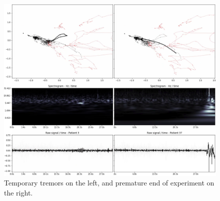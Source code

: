 \begin{figure}[ht]
\centering
\includegraphics[width=\linewidth]{figures/nemo/exp1-337.png}
\caption{Temporary tremors on the left, and premature end of experiment on the right.}
\label{fig:exp1-337}
\end{figure}


